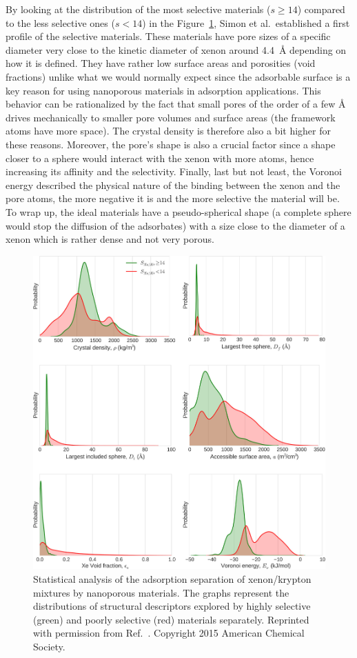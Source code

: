 \documentclass[main.tex]{subfiles}
\begin{document}
By looking at the distribution of the most selective materials ($s\geq 14$) compared to the less selective ones ($s<14$) in the Figure~\ref{fgr:Simon2015}, Simon et al.\ established a first profile of the selective materials. These materials have pore sizes of a specific diameter very close to the kinetic diameter of xenon around \SI{4.4}{\angstrom} depending on how it is defined. They have rather low surface areas and porosities (void fractions) unlike what we would normally expect since the adsorbable surface is a key reason for using nanoporous materials in adsorption applications. This behavior can be rationalized by the fact that small pores of the order of a few \si{\angstrom} drives mechanically to smaller pore volumes and surface areas (the framework atoms have more space). The crystal density is therefore also a bit higher for these reasons. Moreover, the pore's shape is also a crucial factor since a shape closer to a sphere would interact with the xenon with more atoms, hence increasing its affinity and the selectivity. Finally, last but not least, the Voronoi energy described the physical nature of the binding between the xenon and the pore atoms, the more negative it is and the more selective the material will be. To wrap up, the ideal materials have a pseudo-spherical shape (a complete sphere would stop the diffusion of the adsorbates) with a size close to the diameter of a xenon which is rather dense and not very porous.

\begin{figure}[ht]
\centering
  \includegraphics[width=0.7\linewidth]{figures/1-screening/Simon_2015_descriptors.jpeg}
  \caption{Statistical analysis of the adsorption separation of xenon/krypton mixtures by nanoporous materials. The graphs represent the distributions of structural descriptors explored by highly selective (green) and poorly selective (red) materials separately. Reprinted with permission from Ref.~. Copyright 2015 American Chemical Society.}
  \label{fgr:Simon2015}
\end{figure}
\end{document}
